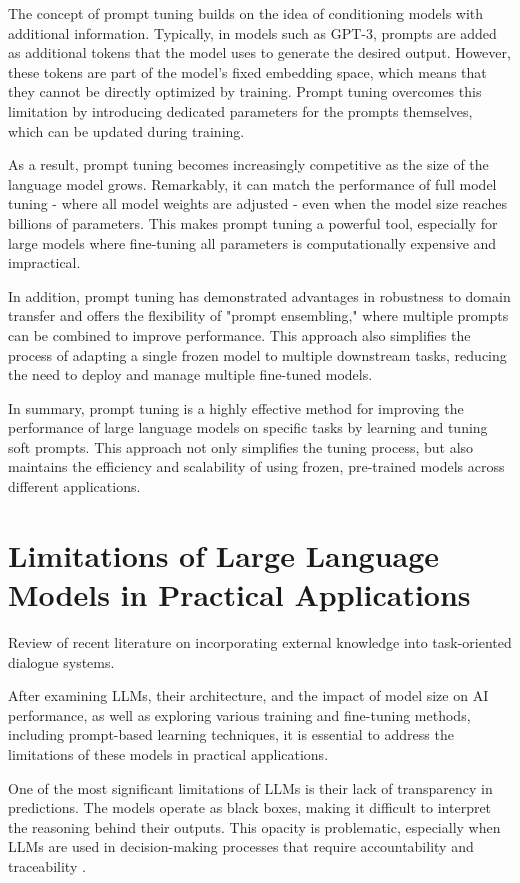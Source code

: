 The concept of prompt tuning builds on the idea of conditioning models with additional information. Typically, in models such as GPT-3, prompts are added as additional tokens that the model uses to generate the desired output. However, these tokens are part of the model's fixed embedding space, which means that they cannot be directly optimized by training. Prompt tuning overcomes this limitation by introducing dedicated parameters for the prompts themselves, which can be updated during training.

As a result, prompt tuning becomes increasingly competitive as the size of the language model grows. Remarkably, it can match the performance of full model tuning - where all model weights are adjusted - even when the model size reaches billions of parameters. This makes prompt tuning a powerful tool, especially for large models where fine-tuning all parameters is computationally expensive and impractical.

In addition, prompt tuning has demonstrated advantages in robustness to domain transfer and offers the flexibility of "prompt ensembling," where multiple prompts can be combined to improve performance. This approach also simplifies the process of adapting a single frozen model to multiple downstream tasks, reducing the need to deploy and manage multiple fine-tuned models. \cite{lester2021power}

In summary, prompt tuning is a highly effective method for improving the performance of large language models on specific tasks by learning and tuning soft prompts. This approach not only simplifies the tuning process, but also maintains the efficiency and scalability of using frozen, pre-trained models across different applications. 

\section{Limitations of Large Language Models in Practical Applications}

Review of recent literature on incorporating external knowledge into task-oriented dialogue systems.

After examining LLMs, their architecture, and the impact of model size on AI performance, as well as exploring various training and fine-tuning methods, including prompt-based learning techniques, it is essential to address the limitations of these models in practical applications.

One of the most significant limitations of LLMs is their lack of transparency in predictions. The models operate as black boxes, making it difficult to interpret the reasoning behind their outputs. This opacity is problematic, especially when LLMs are used in decision-making processes that require accountability and traceability \cite{rudin2019stop}.

